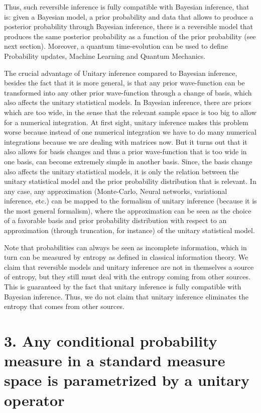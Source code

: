 \documentclass[11pt]{book}
\begin{document}
Thus, such reversible inference is fully compatible with Bayesian
inference, that is: given a Bayesian model, a prior probability and data
that allows to produce a posterior probability through Bayesian
inference, there is a reversible model that produces the same posterior
probability as a function of the prior probability (see next section).
Moreover, a quantum time-evolution can be used to define Probability
updates, Machine Learning and Quantum Mechanics.

The crucial advantage of Unitary inference compared to Bayesian
inference, besides the fact that it is more general, is that any prior
wave-function can be transformed into any other prior wave-function
through a change of basis, which also affects the unitary statistical
models. In Bayesian inference, there are priors which are too wide, in
the sense that the relevant sample space is too big to allow for a
numerical integration. At first sight, unitary inference makes this
problem worse because instead of one numerical integration we have to do
many numerical integrations because we are dealing with matrices now.
But it turns out that it also allows for basis changes and thus a prior
wave-function that is too wide in one basis, can become extremely simple
in another basis. Since, the basis change also affects the unitary
statistical models, it is only the relation between the unitary
statistical model and the prior probability distribution that is
relevant. In any case, any approximation (Monte-Carlo, Neural networks,
variational inference, etc.) can be mapped to the formalism of unitary
inference (because it is the most general formalism), where the
approximation can be seen as the choice of a favorable basis and prior
probability distribution with respect to an approximation (through
truncation, for instance) of the unitary statistical model.

Note that probabilities can always be seen as incomplete information,
which in turn can be measured by entropy as defined in classical
information theory. We claim that reversible models and unitary
inference are not in themselves a source of entropy, but they still must
deal with the entropy coming from other sources. This is guaranteed by
the fact that unitary inference is fully compatible with Bayesian
inference. Thus, we do not claim that unitary inference eliminates the
entropy that comes from other sources.

\hypertarget{any-conditional-probability-measure-in-a-standard-measure-space-is-parametrized-by-a-unitary-operator}{%
\section{3. Any conditional probability measure in a standard measure
space is parametrized by a unitary
operator}\label{any-conditional-probability-measure-in-a-standard-measure-space-is-parametrized-by-a-unitary-operator}}
\end{document}
